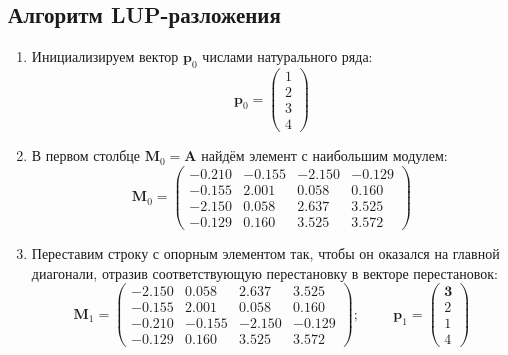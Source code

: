 \subsection{Алгоритм LUP-разложения}
\begin{enumerate}
    \item Инициализируем вектор $\mathbf{p}_0$ числами натурального ряда:
    \[\mathbf{p}_0 = \begin{pmatrix} 1 \\ 2 \\ 3 \\ 4 \end{pmatrix}\]

    \item В первом столбце $\mathbf{M}_0 = \mathbf{A}$ найдём элемент с наибольшим модулем:
    \[\mathbf{M}_0 =
    \begin{pmatrix}
        -0.210&-0.155&-2.150&-0.129\\
        -0.155& 2.001& 0.058& 0.160\\
        \mathbf{-2.150}& 0.058& 2.637& 3.525\\
        -0.129& 0.160& 3.525& 3.572
    \end{pmatrix}\]

    \item Переставим строку с опорным элементом так, чтобы он оказался на главной диагонали, отразив соответствующую перестановку в векторе перестановок:
    \[\mathbf{M}_1 =
    \begin{pmatrix}
        \mathbf{-2.150}& \mathbf{0.058}& \mathbf{2.637}& \mathbf{3.525}\\
        -0.155& 2.001& 0.058& 0.160\\
        \mathit{-0.210}&\mathit{-0.155}&\mathit{-2.150}&\mathit{-0.129}\\
        -0.129& 0.160& 3.525& 3.572
    \end{pmatrix}; \hspace{1cm}
    \mathbf{p}_1 = \begin{pmatrix} \mathbf{3} \\ 2 \\ \mathit{1} \\ 4 \end{pmatrix}\]


\end{enumerate}
